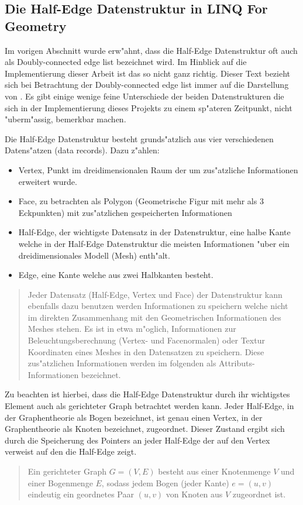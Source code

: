 \documentclass[pagesize, paper=a4, fontsize=12pt,titlepage=true, headings=small, headnosepline, abstractoff, liststotoc, nochapterprefix, plainheadsepline]{scrreprt}
\newcommand{\LFGS}{LINQ For Geometry }
\newcommand{\HES}{Half-Edge Datenstruktur }
\begin{document}
		\subsection {Die Half-Edge Datenstruktur in \LFGS}
			Im vorigen Abschnitt wurde erw"ahnt, dass die \HES oft auch als Doubly-connected edge list bezeichnet wird. Im Hinblick auf die Implementierung dieser Arbeit ist das so nicht ganz richtig. Dieser Text bezieht sich bei Betrachtung der Doubly-connected edge list immer auf die Darstellung von \cite{vanMarkdeBerg.2008}. Es gibt einige wenige feine Unterschiede der beiden Datenstrukturen die sich in der Implementierung dieses Projekts zu einem sp"ateren Zeitpunkt, nicht "uberm"assig, bemerkbar machen.

Die \HES besteht grunds"atzlich aus vier verschiedenen Datens"atzen (data records). Dazu z"ahlen:
\begin{itemize}
\item Vertex, Punkt im dreidimensionalen Raum der um zus"atzliche Informationen erweitert wurde. 
\item Face, zu betrachten als Polygon (Geometrische Figur mit mehr als 3 Eckpunkten) mit zus"atzlichen gespeicherten Informationen
\item Half-Edge, der wichtigste Datensatz in der Datenstruktur, eine halbe Kante welche in der \HES die meisten Informationen "uber ein dreidimensionales Modell (Mesh) enth"alt.
\item Edge, eine Kante welche aus zwei Halbkanten besteht.
\end{itemize}

\begin{quote}Jeder Datensatz (Half-Edge, Vertex und Face) der Datenstruktur kann ebenfalls dazu benutzen werden Informationen zu speichern welche nicht im direkten Zusammenhang mit den Geometrischen Informationen des Meshes stehen. Es ist in etwa m"oglich, Informationen zur Beleuchtungsberechnung (Vertex- und Facenormalen) oder Textur Koordinaten eines Meshes in den Datens{\dq}atzen zu speichern. Diese zus"atzlichen Informationen werden im folgenden als Attributs-Informationen bezeichnet. \cite[S.~31]{vanMarkdeBerg.2008}\end{quote}

Zu beachten ist hierbei, dass die \HES durch ihr wichtigstes Element auch als gerichteter Graph betrachtet werden kann. Jeder Half-Edge, in der Graphentheorie als Bogen bezeichnet, ist genau einen Vertex, in der Graphentheorie als Knoten bezeichnet, zugeordnet. Dieser Zustand ergibt sich durch die Speicherung des Pointers an jeder Half-Edge der auf den Vertex verweist auf den die Half-Edge zeigt.
\begin{quote}Ein gerichteter Graph \(G = (V,E)\) besteht aus einer Knotenmenge \(V\) und einer Bogenmenge \(E\), sodass jedem Bogen (jeder Kante) \(e = (u,v)\) eindeutig ein geordnetes Paar \((u,v)\) von Knoten aus \(V\) zugeordnet ist. \cite[S.~127]{Tittmann.2011}\end{quote}
\end{document}
